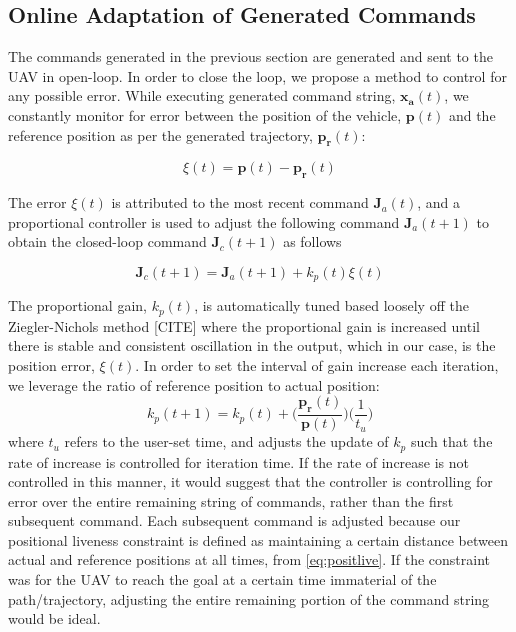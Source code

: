 \documentclass[letterpaper, 10 pt, conference]{ieeeconf}  %
\begin{document}
\subsection{Online Adaptation of Generated Commands}

The commands generated in the previous section are generated and sent to the UAV in open-loop. In order to close the loop, we propose a method to control for any possible error. While executing generated command string, $\mathbf{x_a}(t)$, we constantly monitor for error between the position of the vehicle, $\mathbf{p}(t)$ and the reference position as per the generated trajectory, $\mathbf{p_r}(t)$:

\begin{equation}
    \xi(t) = \mathbf{p}(t)-\mathbf{p_r}(t)
\end{equation}

The error $\xi(t)$ is attributed to the most recent command $\mathbf{J}_a(t)$, and a proportional controller is used to adjust the following command $\mathbf{J}_a(t+1)$ to obtain the closed-loop command $\mathbf{J}_c(t+1)$ as follows

\begin{equation}
    \mathbf{J}_c(t+1) = \mathbf{J}_a(t+1) + k_p(t)\xi(t)
\end{equation}

The proportional gain, $k_p(t)$, is automatically tuned based loosely off the Ziegler-Nichols method [CITE] where the proportional gain is increased until there is stable and consistent oscillation in the output, which in our case, is the position error, $\xi(t)$. In order to set the interval of gain increase each iteration, we leverage the ratio of reference position to actual position:
\begin{equation}
    k_p(t+1) = k_p(t) + \bigg(\frac{\mathbf{p_r}(t)}{\mathbf{p}(t)}\bigg)\bigg(\frac{1}{t_u}\bigg)
\end{equation}
where $t_u$ refers to the user-set time, and adjusts the update of $k_p$ such that the rate of increase is controlled for iteration time. If the rate of increase is not controlled in this manner, it would suggest that the controller is controlling for error over the entire remaining string of commands, rather than the first subsequent command. Each subsequent command is adjusted because our positional liveness constraint is defined as maintaining a certain distance between actual and reference positions at all times, from \eqref{eq:positlive}. If the constraint was for the UAV to reach the goal at a certain time immaterial of the path/trajectory, adjusting the entire remaining portion of the command string would be ideal.
\end{document}
